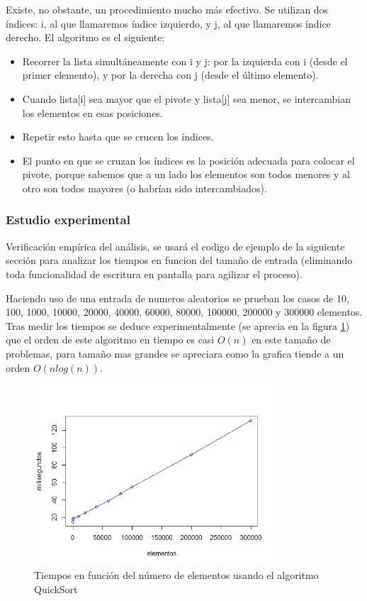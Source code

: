 \documentclass[8pt, A4]{article}    %
\begin{document}
Existe, no obstante, un procedimiento mucho más efectivo. Se utilizan dos índices: i, al que llamaremos índice izquierdo, y j, al que llamaremos índice derecho. El algoritmo es el siguiente:
\begin{itemize}
    \item Recorrer la lista simultáneamente con i y j: por la izquierda con i (desde el primer elemento), y por la derecha con j (desde el último elemento).
    \item Cuando lista[i] sea mayor que el pivote y lista[j] sea menor, se intercambian los elementos en esas posiciones.
    \item Repetir esto hasta que se crucen los índices.
    \item El punto en que se cruzan los índices es la posición adecuada para colocar el pivote, porque sabemos que a un lado los elementos son todos menores y al otro son todos mayores (o habrían sido intercambiados).
\end{itemize}

\newpage

\subsubsection{Estudio experimental}
Verificación empírica del análisis, se usará el codigo de ejemplo de la siguiente sección para analizar los tiempos en funcion del tamaño de entrada (eliminando toda funcionalidad de escritura en pantalla para agilizar el proceso).

Haciendo uso de una entrada de numeros aleatorios se prueban los casos de 10, 100, 1000, 10000, 20000, 40000, 60000, 80000, 100000, 200000 y 300000 elementos.
Tras medir los tiempos se deduce experimentalmente (se aprecia en la figura \ref{fig:quicksortTime}) que el orden de este algoritmo en tiempo es casi $O(n)$ en este tamaño de problemas, para tamaño mas grandes se apreciara como la grafica tiende a un orden  $O(nlog(n))$.

\begin{figure}[h]
\begin{center}
\includegraphics[width=0.8\textwidth]{graph/quicksortTime}
\end{center}
\caption{Tiempos en función del número de elementos usando el algoritmo QuickSort}
\label{fig:quicksortTime}
\end{figure}
\end{document}
